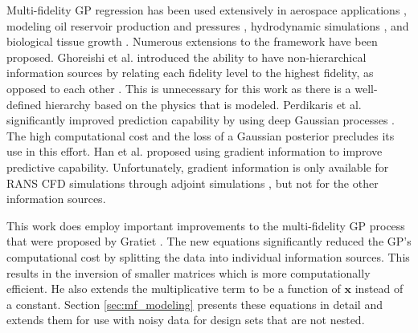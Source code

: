 Multi-fidelity GP regression has been used extensively in aerospace applications \cite{lam_surrogate_nodate,menhorn_multifideliy_nodate}, modeling oil reservoir production and pressures \cite{kennedy_predicting_2000}, hydrodynamic simulations \cite{le_gratiet_recursive_2014}, and biological tissue growth \cite{lee2020propagation}.
Numerous extensions to the framework have been proposed.
Ghoreishi et al. introduced the ability to have non-hierarchical information sources by relating each fidelity level to the highest fidelity, as opposed to each other \cite{ghoreishi_gaussian_2018}. 
This is unnecessary for this work as there is a well-defined hierarchy based on the physics that is modeled. 
Perdikaris et al. \cite{perdikaris_nonlinear_2017} significantly improved prediction capability by using deep Gaussian processes \cite{damianou2013deep}.
The high computational cost and the loss of a Gaussian posterior precludes its use in this effort. 
Han et al. \cite{han_improving_2013} proposed using gradient information to improve predictive capability.
Unfortunately, gradient information is only available for RANS CFD simulations through adjoint simulations \cite{jameson1988aerodynamic}, but not for the other information sources. 

This work does employ important improvements to the multi-fidelity GP process that were proposed by Gratiet \cite{gratiet_multi-fidelity_nodate}.
The new equations significantly reduced the GP's computational cost by splitting the data into individual information sources.
This results in the inversion of smaller matrices which is more computationally efficient. 
He also extends the multiplicative term to be a function of $\mathbf{x}$ instead of a constant.
Section \ref{sec:mf_modeling} presents these equations in detail and extends them for use with noisy data for design sets that are not nested. 